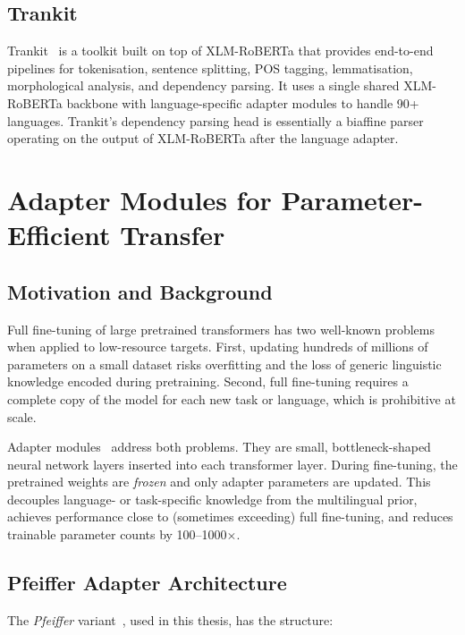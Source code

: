 \documentclass[12pt,a4paper,oneside]{report}
\newcommand{\xlmr}{XLM-RoBERTa}
\begin{document}
\subsection{Trankit}
\label{sec:trankit}

Trankit~\citep{nguyen2021trankit} is a toolkit built on top of \xlmr{} that
provides end-to-end pipelines for tokenisation, sentence splitting, POS tagging,
lemmatisation, morphological analysis, and dependency parsing. It uses a single
shared \xlmr{} backbone with language-specific adapter modules to handle 90+
languages. Trankit's dependency parsing head is essentially a biaffine parser
operating on the output of \xlmr{} after the language adapter.

\section{Adapter Modules for Parameter-Efficient Transfer}
\label{sec:adapters}

\subsection{Motivation and Background}

Full fine-tuning of large pretrained transformers has two well-known problems
when applied to low-resource targets. First, updating hundreds of millions of
parameters on a small dataset risks overfitting and the loss of generic
linguistic knowledge encoded during pretraining. Second, full fine-tuning
requires a complete copy of the model for each new task or language, which is
prohibitive at scale.

Adapter modules~\citep{houlsby2019parameter,pfeiffer2020adapterhub} address both
problems. They are small, bottleneck-shaped neural network layers inserted into
each transformer layer. During fine-tuning, the pretrained weights are
\emph{frozen} and only adapter parameters are updated. This decouples
language- or task-specific knowledge from the multilingual prior, achieves
performance close to (sometimes exceeding) full fine-tuning, and reduces
trainable parameter counts by 100--1000$\times$.

\subsection{Pfeiffer Adapter Architecture}

The \emph{Pfeiffer} variant~\citep{pfeiffer2020adapterhub}, used in this thesis,
has the structure:
\end{document}
